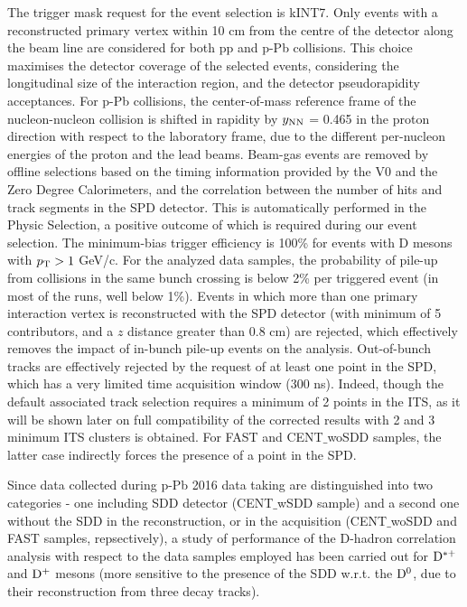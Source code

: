 The trigger mask request for the event selection is kINT7. Only events with a reconstructed primary vertex within 10 cm from the centre of the detector along the beam line are considered for both pp and p-Pb collisions. This choice maximises the detector coverage of the selected events, considering the longitudinal size of the interaction region, and
the detector pseudorapidity acceptances. For p-Pb collisions, the center-of-mass reference frame of the nucleon-nucleon collision is shifted in rapidity by $y_{\rm NN}$ = 0.465 in the proton direction with respect to the laboratory frame, due to the different per-nucleon energies of the proton and the lead beams.
Beam-gas events are removed by offline selections based on the timing information provided by the V0 and the Zero Degree Calorimeters, and the correlation between the number of hits and track segments in the SPD detector. This is automatically performed in the Physic Selection, a positive outcome of which is required during our event selection.
The minimum-bias trigger efficiency is 100\% for events with D mesons with $p_{\rm T} > 1$ GeV/c. For the analyzed data samples, the probability of
pile-up from collisions in the same bunch crossing is below 2\% per triggered event (in most of the runs, well below 1\%). Events in which more than one primary interaction vertex is reconstructed with the SPD detector (with minimum of 5 contributors, and a $z$ distance greater than 0.8 cm) are
rejected, which effectively removes the impact of in-bunch pile-up events on the analysis. Out-of-bunch tracks are effectively rejected by the request of at least one point in the SPD, which has a very limited time acquisition window (300 ns). Indeed, though the default associated track selection requires a minimum of 2 points in the ITS, as it will be shown later on full compatibility of the corrected results with 2 and 3 minimum ITS clusters is obtained. For FAST and CENT$\_$woSDD samples, the latter case indirectly forces the presence of a point in the SPD.

Since data collected during p-Pb 2016 data taking are distinguished into two categories - one including SDD detector (CENT$\_$wSDD sample) and a second one without the SDD in the reconstruction, or in the acquisition (CENT$\_$woSDD and FAST samples, repsectively), a study of performance of the D-hadron correlation analysis with respect to the data samples employed has been carried out for ${\rm D^{*+}}$ and ${\rm D^+}$ mesons (more sensitive to the presence of the SDD w.r.t. the ${\rm D^0}$, due to their reconstruction from three decay tracks).


